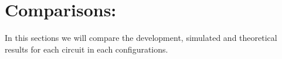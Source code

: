 \section{Comparisons:}

In this sections we will compare the development, simulated and theoretical results for each circuit in each configurations.